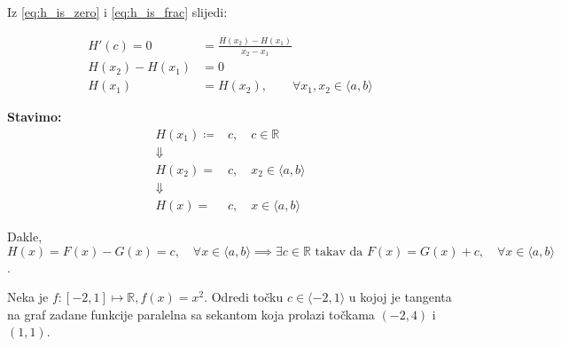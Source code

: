 \begin{multicols}{2}
Iz \ref{eq:h_is_zero} i \ref{eq:h_is_frac} slijedi:

\begin{align*}
H'(c) = 0 &= \frac{H(x_2)-H(x_1)}{x_2-x_1}\\
H(x_2)-H(x_1) &= 0\\
H(x_1) &= H(x_2),\qquad\forall x_1, x_2\in \langle a,b \rangle
\end{align*}

\noindent
\textbf{Stavimo:}
\begin{align*}
    H(x_1)\coloneq& c,\quad c\in\mathbb{R}\\
    \Downarrow&\\
    H(x_2)=&c,\quad x_2\in\langle a,b \rangle\\
    \Downarrow&\\
    H(x)=&c,\quad x\in\langle a,b \rangle
\end{align*}

\noindent
Dakle, $H(x) = F(x)-G(x)=c,\quad\forall x\in \langle a,b \rangle\implies\exists c\in\mathbb{R}\text{ takav da }F(x)=G(x)+c,\quad \forall x\in \langle a,b \rangle$.

\end{multicols}

\begin{example}
    Neka je $f:[-2,1] \mapsto \mathbb{R}, f(x) = x^2$.
    Odredi točku $c\in\langle -2,1 \rangle$ u kojoj je tangenta na graf zadane
    funkcije paralelna sa sekantom koja prolazi točkama $(-2,4)$ i $(1,1)$.
\end{example}
